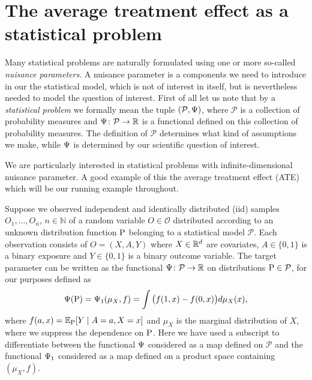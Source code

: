 \documentclass[a4,danish]{article}
\begin{document}


\section{The average treatment effect as a statistical problem}
\label{sec:introduction}

Many statistical problems are naturally formulated using one or more so-called \textit{nuisance
  parameters}. A nuisance parameter is a components we need to introduce in our the statistical
model, which is not of interest in itself, but is nevertheless needed to model the question of
interest. First of all let us note that by a \textit{statistical problem} we formally mean the tuple
$(\mathcal{P}, \TT)$, where $\mathcal{P}$ is a collection of probability measures and
$\TT \colon \mathcal{P} \rightarrow \R$ is a functional defined on this collection of probability
measures. The definition of $\mathcal{P}$ determines what kind of assumptions we make, while $\TT$
is determined by our scientific question of interest. 

We are particularly interested in statistical problems with infinite-dimensional nuisance parameter.
A good example of this the average treatment effect (ATE) which will be our running example
throughout.

\begin{example}[ATE]
  \label{example:aver-treatm-effect}
  Suppose we observed independent and identically distributed (iid) samples \(O_1,\ldots,O_n\),
  \(n\in\mathbb{N}\) of a random variable \(O \in\mathcal{O}\) distributed according to an unknown
  distribution function \(\P\) belonging to a statistical model \(\mathcal{P}\). Each observation
  consists of \(O= (X, A, Y)\) where \(X\in \R^d\) are covariates, \(A\in \lbrace 0,1\rbrace\) is a
  binary exposure and \(Y\in\lbrace 0, 1\rbrace\) is a binary outcome variable. The target parameter
  can be written as the functional \(\TT \colon \mathcal{P} \rightarrow \R\) on distributions
  \(\P\in\mathcal{P}\), for our purposes defined as
  \begin{align}
    \TT(\P) = \TT_1( \mu_X, f) = \int \big( f( 1, x) - f(0, x) \big) d\mu_X (x), 
    \label{eq:Psi:ate}
  \end{align}
  where \(f (a, x) = \E_{\P} [ Y \mid A=a, X=x]\) and \(\mu_X \) is the marginal distribution of
  \(X\), where we suppress the dependence on $\P$. Here we have used a subscript to differentiate
  between the functional $\TT$ considered as a map defined on $\mathcal{P}$ and the functional
  $\TT_1$ considered as a map defined on a product space containing $(\mu_X, f)$.
\end{example}
\end{document}
